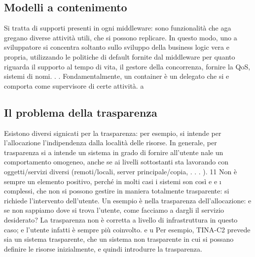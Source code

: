\subsection{Modelli a contenimento}
Si tratta di supporti presenti in ogni middleware: sono funzionalità che aga
gregano diverse attività utili, che si possono replicare. In questo modo, uno
a
sviluppatore si concentra soltanto sullo sviluppo della business logic vera e
propria, utilizzando le politiche di default fornite dal middleware per quanto
riguarda il supporto al tempo di vita, il gestore della concorrenza, fornire la
QoS, sistemi di nomi. . . Fondamentalmente, un container è un delegato che si
e
comporta come supervisore di certe attività.
a
\subsection{Il problema della trasparenza}
Esistono diversi signicati per la trasparenza: per esempio, si intende per l'allocazione l'indipendenza dalla località
delle risorse. In generale, per trasparenza si
a
intende un sistema in grado di fornire all'utente nale un comportamento omogeneo, anche se ai livelli sottostanti sta
lavorando con oggetti/servizi diversi
(remoti/locali, server principale/copia, . . . ).
11
Non è sempre un elemento positivo, perché in molti casi i sistemi son così
e
e
\i{}
complessi, che non si possono gestire in maniera totalmente trasparente: si
richiede l'intervento dell'utente. Un esempio è nella trasparenza dell'allocazione:
e
se non sappiamo dove si trova l'utente, come facciamo a dargli il servizio desiderato? La trasparenza non è corretta a
livello di infrastruttura in questo caso;
e
l'utente infatti è sempre più coinvolto.
e
u
Per esempio, TINA-C2 prevede sia un sistema trasparente, che un sistema
non trasparente in cui si possano definire le risorse inizialmente, e quindi introdurre la trasparenza.
